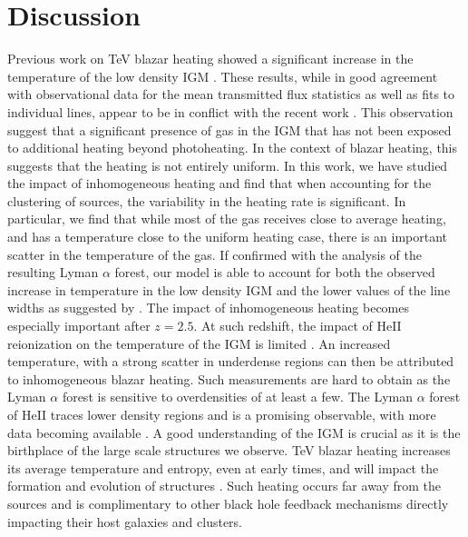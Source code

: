 \documentclass[twocolumns]{emulateapj}
\begin{document}
\section{Discussion}
Previous work on TeV blazar heating showed a significant increase in the temperature of the low density IGM \citep{2012ApJ...752...23C,2012MNRAS.423..149P}. These results, while in good agreement with observational data for the mean transmitted flux statistics as well as fits to individual lines, appear to be in conflict with the recent work \citep{2012ApJ...757L..30R}. This observation suggest that a significant presence of gas in the IGM that has not been exposed to additional heating beyond photoheating. In the context of blazar heating, this suggests that the heating is not entirely uniform. In this work, we have studied the impact of inhomogeneous heating and find that when accounting for the clustering of sources, the variability in the heating rate is significant. In particular, we find that while most of the gas receives close to average heating, and has a temperature close to the uniform heating case, there is an important scatter in the temperature of the gas. If confirmed with the analysis of the resulting Lyman $\alpha$ forest, our model is able to account for both the observed increase in temperature in the low density IGM \citep{2014MNRAS.441.1916B,2009MNRAS.399L..39V} and the lower values of the line widths as suggested by \citet{2012ApJ...757L..30R}.
The impact of inhomogeneous heating becomes especially important after $z=2.5$. At such redshift, the impact of HeII reionization on the temperature of the IGM is limited \citep{2013MNRAS.435.3169C}. An increased temperature, with a strong scatter in underdense regions can then be attributed to inhomogeneous blazar heating. Such measurements are hard to obtain as the Lyman $\alpha$ forest is sensitive to overdensities of at least a few. The Lyman $\alpha$ forest of HeII traces lower density regions and is a promising observable, with more data becoming available \citep{2014arXiv1405.7405W}.
A good understanding of the IGM is crucial as it is the birthplace of the large scale structures we observe. TeV blazar heating increases its average temperature and entropy, even at early times, and will impact the formation and evolution of structures \citep{2012ApJ...752...24P}. Such heating occurs far away from the sources and is complimentary to other black hole feedback mechanisms directly impacting their host galaxies and clusters.
\end{document}
